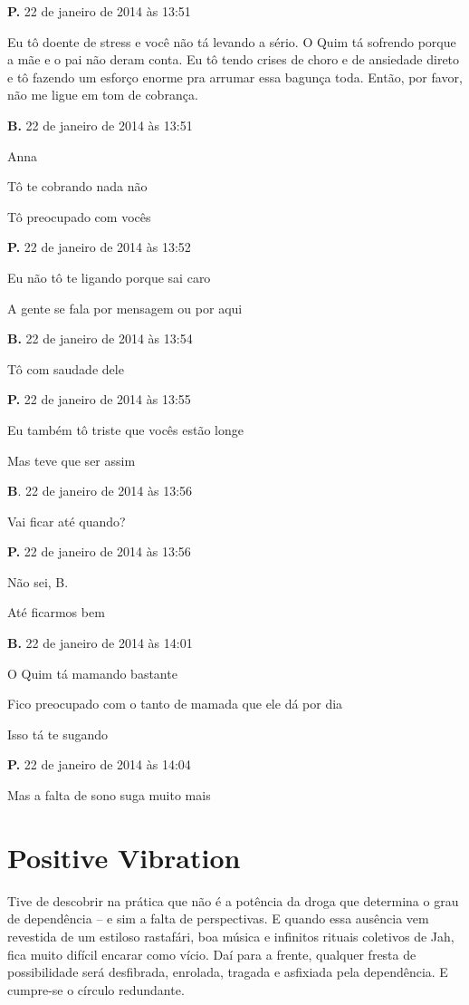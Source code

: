 {\parindent0pt\parskip1pt\raggedright
\textbf{P.} 22 de janeiro de 2014 às 13:51

Eu tô doente de stress e você não tá levando a sério. O Quim tá sofrendo
porque a mãe e o pai não deram conta. Eu tô tendo crises de choro e de
ansiedade direto e tô fazendo um esforço enorme pra arrumar essa bagunça
toda. Então, por favor, não me ligue em tom de cobrança.

\textbf{B.} 22 de janeiro de 2014 às 13:51

Anna

Tô te cobrando nada não

Tô preocupado com vocês

\textbf{P.} 22 de janeiro de 2014 às 13:52

Eu não tô te ligando porque sai caro

A gente se fala por mensagem ou por aqui

\textbf{B.} 22 de janeiro de 2014 às 13:54

Tô com saudade dele

\textbf{P.} 22 de janeiro de 2014 às 13:55

Eu também tô triste que vocês estão longe

Mas teve que ser assim

\textbf{B}. 22 de janeiro de 2014 às 13:56

Vai ficar até quando?

\textbf{P.} 22 de janeiro de 2014 às 13:56

Não sei, B.

Até ficarmos bem

\textbf{B.} 22 de janeiro de 2014 às 14:01

O Quim tá mamando bastante

Fico preocupado com o tanto de mamada que ele dá por dia

Isso tá te sugando

\textbf{P.} 22 de janeiro de 2014 às 14:04

Mas a falta de sono suga muito mais
}

\chapter{Positive Vibration}

Tive de descobrir na prática que não é a potência da droga que determina
o grau de dependência -- e sim a falta de perspectivas. E quando essa
ausência vem revestida de um estiloso rastafári, boa música e infinitos
rituais coletivos de Jah, fica muito difícil encarar como vício. Daí
para a frente, qualquer fresta de possibilidade será desfibrada,
enrolada, tragada e asfixiada pela dependência. E cumpre-se o círculo
redundante.

